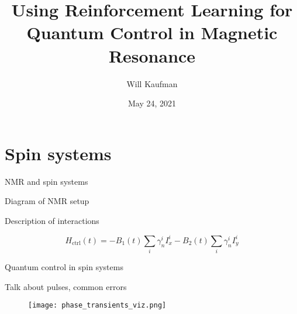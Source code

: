 \documentclass{beamer}
\title[RL for Quantum Control in NMR]{Using Reinforcement Learning for Quantum Control in Magnetic Resonance}
\author[Will Kaufman]{
Will Kaufman\inst{1}
}
\date[Spring 2021]{May 24, 2021 \\
}
\institute[Dartmouth College]{
\inst{1}Department of Physics and Astronomy, Dartmouth College \\
Hanover, NH 03755, USA
}
\begin{document}
\frame{\titlepage}


\section{Spin systems}


\begin{frame}{NMR and spin systems}

Diagram of NMR setup

Description of interactions

\begin{figure}
\centering

\end{figure}

\[
    H_{\text{ctrl}}(t) = -B_1(t) \sum_i \gamma_n^i I_x^i -B_2(t) \sum_i \gamma_n^i I_y^i
\]


\end{frame}


\begin{frame}{Quantum control in spin systems}

Talk about pulses, common errors

\begin{figure}
    \centering
    \scalebox{.5}{
    
    }
    \hspace{1em}
    \texttt{[image: phase\_transients\_viz.png]}
\end{figure}


\end{frame}
\end{document}
